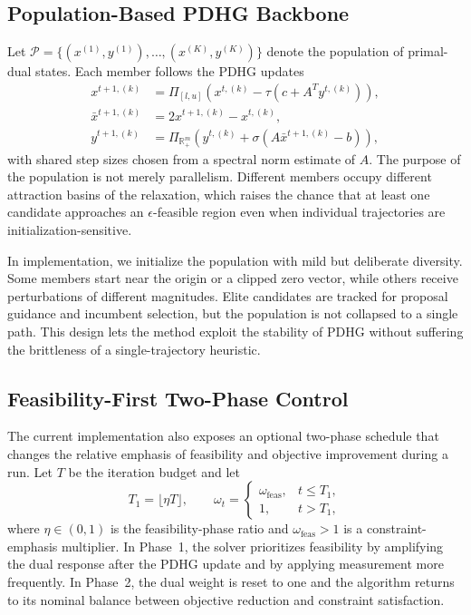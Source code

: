 \subsection{Population-Based PDHG Backbone}
\label{subsec:pop_pdhg}

Let $\mathcal{P} = \{(x^{(1)}, y^{(1)}), \ldots, (x^{(K)}, y^{(K)})\}$ denote the population of primal-dual states. Each member follows the PDHG updates
\begin{align}
    x^{t+1,(k)} &= \Pi_{[l,u]}\left(x^{t,(k)} - \tau(c + A^T y^{t,(k)})\right), \\
    \bar{x}^{t+1,(k)} &= 2x^{t+1,(k)} - x^{t,(k)}, \\
    y^{t+1,(k)} &= \Pi_{\mathbb{R}^m_+}\left(y^{t,(k)} + \sigma(A\bar{x}^{t+1,(k)} - b)\right),
\end{align}
with shared step sizes chosen from a spectral norm estimate of $A$. The purpose of the population is not merely parallelism. Different members occupy different attraction basins of the relaxation, which raises the chance that at least one candidate approaches an $\epsilon$-feasible region even when individual trajectories are initialization-sensitive.

In implementation, we initialize the population with mild but deliberate diversity. Some members start near the origin or a clipped zero vector, while others receive perturbations of different magnitudes. Elite candidates are tracked for proposal guidance and incumbent selection, but the population is not collapsed to a single path. This design lets the method exploit the stability of PDHG without suffering the brittleness of a single-trajectory heuristic.

\subsection{Feasibility-First Two-Phase Control}
\label{subsec:two_phase}

The current implementation also exposes an optional two-phase schedule that changes the relative emphasis of feasibility and objective improvement during a run. Let $T$ be the iteration budget and let
\begin{equation}
T_1 = \lfloor \eta T \rfloor,
\qquad
\omega_t =
\begin{cases}
\omega_{\mathrm{feas}}, & t \leq T_1, \\
1, & t > T_1,
\end{cases}
\label{eq:two_phase}
\end{equation}
where $\eta \in (0,1)$ is the feasibility-phase ratio and $\omega_{\mathrm{feas}} > 1$ is a constraint-emphasis multiplier. In Phase~1, the solver prioritizes feasibility by amplifying the dual response after the PDHG update and by applying measurement more frequently. In Phase~2, the dual weight is reset to one and the algorithm returns to its nominal balance between objective reduction and constraint satisfaction.

